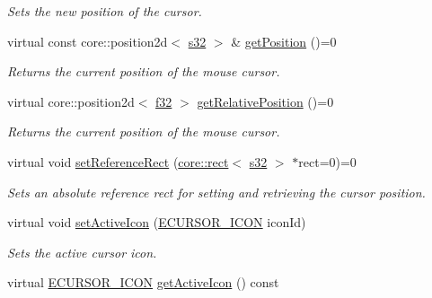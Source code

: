 \begin{DoxyCompactItemize}
\begin{DoxyCompactList}\small\item\em Sets the new position of the cursor. \end{DoxyCompactList}\item 
virtual const core\+::position2d$<$ \hyperlink{namespaceirr_ac66849b7a6ed16e30ebede579f9b47c6}{s32} $>$ \& \hyperlink{classirr_1_1gui_1_1ICursorControl_a65d9f6e734baa02be69b7e9f5fbdd565}{get\+Position} ()=0
\begin{DoxyCompactList}\small\item\em Returns the current position of the mouse cursor. \end{DoxyCompactList}\item 
virtual core\+::position2d$<$ \hyperlink{namespaceirr_a0277be98d67dc26ff93b1a6a1d086b07}{f32} $>$ \hyperlink{classirr_1_1gui_1_1ICursorControl_a8ba1cb0ff11edc5fb32cdadddece09f8}{get\+Relative\+Position} ()=0
\begin{DoxyCompactList}\small\item\em Returns the current position of the mouse cursor. \end{DoxyCompactList}\item 
virtual void \hyperlink{classirr_1_1gui_1_1ICursorControl_a2a7428ef716a60f8f4b86361a69b8770}{set\+Reference\+Rect} (\hyperlink{classirr_1_1core_1_1rect}{core\+::rect}$<$ \hyperlink{namespaceirr_ac66849b7a6ed16e30ebede579f9b47c6}{s32} $>$ $\ast$rect=0)=0
\begin{DoxyCompactList}\small\item\em Sets an absolute reference rect for setting and retrieving the cursor position. \end{DoxyCompactList}\item 
virtual void \hyperlink{classirr_1_1gui_1_1ICursorControl_af394700d5279b13cc0f2bcdad679469c}{set\+Active\+Icon} (\hyperlink{namespaceirr_1_1gui_aefee802dd632c5735703e40ef40f879b}{E\+C\+U\+R\+S\+O\+R\+\_\+\+I\+C\+ON} icon\+Id)
\begin{DoxyCompactList}\small\item\em Sets the active cursor icon. \end{DoxyCompactList}\item 
\mbox{\label{classirr_1_1gui_1_1ICursorControl_aeffb0659049614ced7a56b607177c3bb}} 
virtual \hyperlink{namespaceirr_1_1gui_aefee802dd632c5735703e40ef40f879b}{E\+C\+U\+R\+S\+O\+R\+\_\+\+I\+C\+ON} \hyperlink{classirr_1_1gui_1_1ICursorControl_aeffb0659049614ced7a56b607177c3bb}{get\+Active\+Icon} () const

\end{DoxyCompactItemize}
